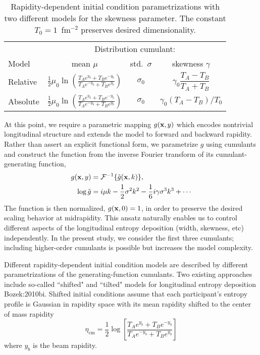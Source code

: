 \begin{table}
  \caption{
    \label{tab:parametrization}
    Rapidity-dependent initial condition parametrizations with two different models for the skewness parameter. The constant $T_0 = 1$~fm$^{-2}$ preserves desired dimensionality.
  }

    \begin{tabular}{lccc}
      & \multicolumn{3}{c}{Distribution cumulant:} \\
      \noalign{\smallskip}\cline{2-4}\noalign{\smallskip}
      Model & \multicolumn{1}{c}{mean $\mu$} & \multicolumn{1}{c}{std.\ $\sigma$} & \multicolumn{1}{c}{skewness $\gamma$} \\
      \paddedhline \noalign{\smallskip}
        Relative  & $\frac{1}{2} \mu_0 \ln\left(\frac{T_A e^{y_b}+T_B e^{-y_b}}{T_A e^{-y_b} + T_B e^{y_b}}\right)$ & $\sigma_0$ & $\gamma_0 \dfrac{T_A - T_B}{T_A + T_B}$ \smallskip\\
        Absolute & $\frac{1}{2} \mu_0 \ln\left(\frac{T_A e^{y_b}+T_B e^{-y_b}}{T_A e^{-y_b} + T_B e^{y_b}}\right)$  & $\sigma_0$ & $\gamma_0 (T_A - T_B)/T_0$\smallskip
    \end{tabular}

\end{table}

At this point, we require a parametric mapping $g(\mathbf x, y)$ which encodes nontrivial longitudinal structure and extends the model to forward and backward rapidity.
Rather than assert an explicit functional form, we parametrize $g$ using cumulants and construct the function from the inverse Fourier transform of its cumulant-generating function,
\begin{align}
  g(\mathbf x, y) &= \mathcal{F}^{-1}\{\tilde{g}(\mathbf x, k)\}, \label{gfunc} \\
  \log \tilde{g} &=  i \mu k - \frac{1}{2}\sigma^2 k^2 - \frac{1}{6} i \gamma \sigma^3 k^3 + \cdots \label{cgf}
\end{align}
The function is then normalized, $g(\mathbf x, 0)=1$, in order to preserve the desired scaling behavior at midrapidity.
This ansatz naturally enables us to control different aspects of the longitudinal entropy deposition (width, skewness, etc) independently.
In the present study, we consider the first three cumulants; including higher-order cumulants is possible but increases the model complexity.

Different rapidity-dependent initial condition models are described by different parametrizations of the generating-function cumulants.
Two existing approaches include so-called ``shifted" and ``tilted" models for longitudinal entropy deposition {Bozek:2010bi}.
Shifted initial conditions assume that each participant's entropy profile is Gaussian in rapidity space with its mean rapidity shifted to the center of mass rapidity
\begin{equation}
  \eta_\text{cm}=\frac{1}{2} \log \left[\frac{T_A e^{y_b}+T_Be^{-y_b}}{T_A e^{-y_b}+T_B e^{y_b}}\right]
\end{equation}
where $y_b$ is the beam rapidity.

